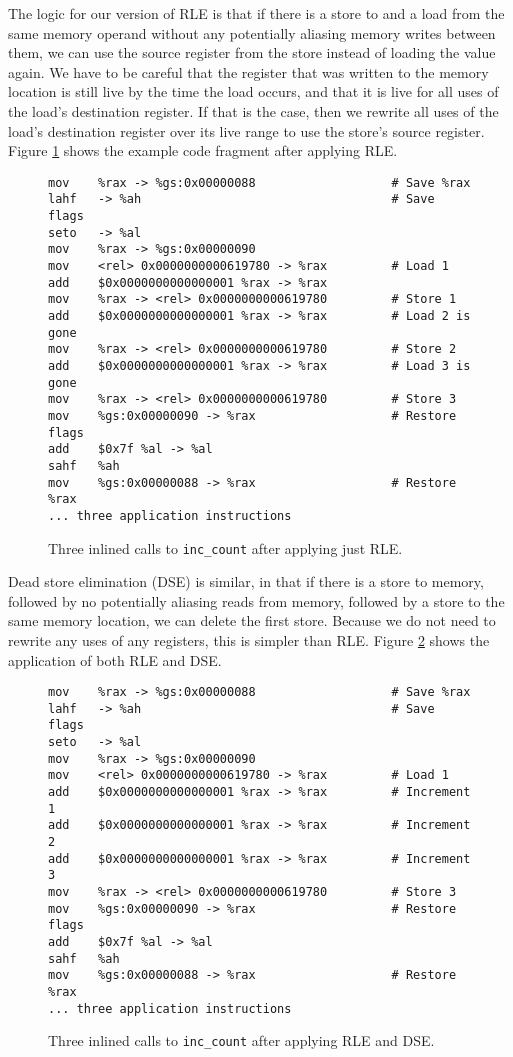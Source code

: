 The logic for our version of RLE is that if there is a store to and a load from
the same memory operand without any potentially aliasing memory writes between
them, we can use the source register from the store instead of loading the value
again.  We have to be careful that the register that was written to the memory
location is still live by the time the load occurs, and that it is live for all
uses of the load's destination register.  If that is the case, then we rewrite
all uses of the load's destination register over its live range to use the
store's source register.  Figure \ref{fig:inscount_rle} shows the example code
fragment after applying RLE.

\begin{figure}
\begin{verbatim}
mov    %rax -> %gs:0x00000088                   # Save %rax
lahf   -> %ah                                   # Save flags
seto   -> %al 
mov    %rax -> %gs:0x00000090 
mov    <rel> 0x0000000000619780 -> %rax         # Load 1
add    $0x0000000000000001 %rax -> %rax 
mov    %rax -> <rel> 0x0000000000619780         # Store 1
add    $0x0000000000000001 %rax -> %rax         # Load 2 is gone
mov    %rax -> <rel> 0x0000000000619780         # Store 2
add    $0x0000000000000001 %rax -> %rax         # Load 3 is gone
mov    %rax -> <rel> 0x0000000000619780         # Store 3
mov    %gs:0x00000090 -> %rax                   # Restore flags
add    $0x7f %al -> %al 
sahf   %ah 
mov    %gs:0x00000088 -> %rax                   # Restore %rax
... three application instructions
\end{verbatim}
\caption{Three inlined calls to {\tt inc\_count} after applying just RLE.}
\label{fig:inscount_rle}
\end{figure}

Dead store elimination (DSE) is similar, in that if there is a store to memory,
followed by no potentially aliasing reads from memory, followed by a store to
the same memory location, we can delete the first store.  Because we do not need
to rewrite any uses of any registers, this is simpler than RLE.  Figure
\ref{fig:inscount_rle_dse} shows the application of both RLE and DSE.

\begin{figure}
\begin{verbatim}
mov    %rax -> %gs:0x00000088                   # Save %rax
lahf   -> %ah                                   # Save flags
seto   -> %al 
mov    %rax -> %gs:0x00000090 
mov    <rel> 0x0000000000619780 -> %rax         # Load 1
add    $0x0000000000000001 %rax -> %rax         # Increment 1
add    $0x0000000000000001 %rax -> %rax         # Increment 2
add    $0x0000000000000001 %rax -> %rax         # Increment 3
mov    %rax -> <rel> 0x0000000000619780         # Store 3
mov    %gs:0x00000090 -> %rax                   # Restore flags
add    $0x7f %al -> %al 
sahf   %ah 
mov    %gs:0x00000088 -> %rax                   # Restore %rax
... three application instructions
\end{verbatim}
\caption{Three inlined calls to {\tt inc\_count} after applying RLE and DSE.}
\label{fig:inscount_rle_dse}
\end{figure}

